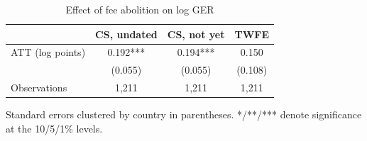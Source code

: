 \begin{table}[t]
\centering
\begin{threeparttable}
\caption{Effect of fee abolition on log GER}
\label{tab:robust_log}
\begin{tabular}{lccc}
\toprule
 & CS, undated & CS, not yet & TWFE \\
\midrule
ATT (log points) & 0.192*** & 0.194*** & 0.150 \\
 & (0.055) & (0.055) & (0.108) \\
Observations & 1,211 & 1,211 & 1,211 \\
\bottomrule
\end{tabular}
\begin{tablenotes}[flushleft]
\footnotesize
\item Standard errors clustered by country in parentheses. */**/*** denote significance at the 10/5/1\% levels.
\end{tablenotes}
\end{threeparttable}
\end{table}
